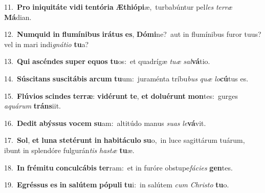 {{\numbfont\textcolor{\numbcolor}{11.}}~\textbf{Pro} \textbf{in}\-\textbf{i}\textbf{qui}\textbf{tá}\textbf{te} \textbf{vi}\-\textbf{di} \textbf{ten}\-\textbf{tó}\textbf{ri}\textbf{a} \textbf{Æ}\-\textbf{thi}\textbf{ó}\textbf{pi}æ,~\star turbabúntur pel\textit{les} \textit{ter}\-\textit{ræ} \textbf{Má}\-dian.\par
{\numbfont\textcolor{\numbcolor}{12.}}~\-\textbf{Num}\-\textbf{quid} \textbf{in} \textbf{flu}\-\textbf{mí}\textbf{ni}\textbf{bus} \textbf{i}\-\textbf{rá}\textbf{tus} \textbf{es}\-, \textbf{Dó}\-\textbf{mi}ne?~\star aut in flumínibus furor tuus? vel in mari indi\-\textit{gná}\-\textit{ti}\textit{o} \textbf{tu}\-a?\par
{\numbfont\textcolor{\numbcolor}{13.}}~\textbf{Qui} \textbf{a}\-\textbf{scén}\textbf{des} \textbf{su}\-\textbf{per} \textbf{e}\-\textbf{quos} \textbf{tu}\-os:~\star et quadrígæ \textit{tu}\-\textit{æ} \textit{sal}\-\textbf{vá}tio.\par
{\numbfont\textcolor{\numbcolor}{14.}}~\-\textbf{Sú}\-\textbf{sci}\textbf{tans} \textbf{su}\-\textbf{sci}\textbf{tá}\textbf{bis} \textbf{ar}\-\textbf{cum} \textbf{tu}\-um:~\star juraménta tríbu\textit{bus} \textit{quæ} \textit{lo}\-\textbf{cú}tus es.\par
{\numbfont\textcolor{\numbcolor}{15.}}~\-\textbf{Flú}\-\textbf{vi}\textbf{os} \textbf{scin}\-\textbf{des} \textbf{ter}\-\textbf{ræ}: \textbf{vi}\-\textbf{dé}\textbf{runt} \textbf{te}\-, \textbf{et} \textbf{do}\-\textbf{lu}\textbf{é}\textbf{runt} \textbf{mon}\-tes:~\star gurges \textit{a}\-\textit{quá}\textit{rum} \textbf{tráns}\-iit.\par
{\numbfont\textcolor{\numbcolor}{16.}}~\-\textbf{De}\-\textbf{dit} \textbf{a}\-\textbf{býs}\textbf{sus} \textbf{vo}\-\textbf{cem} \textbf{su}\-am:~\star altitúdo manus \textit{su}\-\textit{as} \textit{le}\-\textbf{vá}vit.\par
{\numbfont\textcolor{\numbcolor}{17.}}~\-\textbf{Sol}\-, \textbf{et} \textbf{lu}\-\textbf{na} \textbf{ste}\-\textbf{té}\textbf{runt} \textbf{in} \textbf{ha}\-\textbf{bi}\textbf{tá}\textbf{cu}\textbf{lo} \textbf{su}\-o,~\star in luce sagittárum tuárum, ibunt in splendóre fulgurán\textit{tis} \textit{has}\-\textit{tæ} \textbf{tu}\-æ.\par
{\numbfont\textcolor{\numbcolor}{18.}}~\textbf{In} \textbf{fré}\-\textbf{mi}\textbf{tu} \textbf{con}\-\textbf{cul}\textbf{cá}\textbf{bis} \textbf{ter}\-ram:~\star et in furóre obstupe\-\textit{fá}\-\textit{ci}\textit{es} \textbf{gen}\-tes.\par
{\numbfont\textcolor{\numbcolor}{19.}}~\-\textbf{E}\-\textbf{grés}\textbf{sus} \textbf{es} \textbf{in} \textbf{sa}\-\textbf{lú}\textbf{tem} \textbf{pó}\-\textbf{pu}\textbf{li} \textbf{tu}\-i:~\star in salútem \textit{cum} \textit{Chris}\-\textit{to} \textbf{tu}\-o.\par
}
